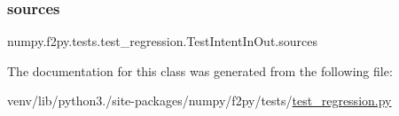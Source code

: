 \subsubsection{\texorpdfstring{sources}{sources}}
{\footnotesize\ttfamily numpy.\+f2py.\+tests.\+test\+\_\+regression.\+Test\+Intent\+In\+Out.\+sources\hspace{0.3cm}{\ttfamily [static]}}



The documentation for this class was generated from the following file\+:\begin{DoxyCompactItemize}
\item 
venv/lib/python3./site-\/packages/numpy/f2py/tests/\hyperlink{f2py_2tests_2test__regression_8py}{test\+\_\+regression.\+py}\end{DoxyCompactItemize}
